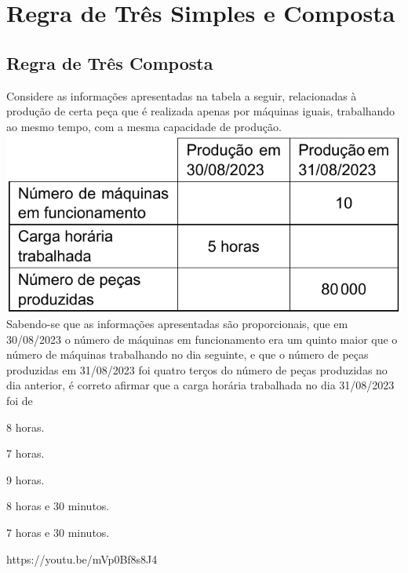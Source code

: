 \chapter{Regra de Três Simples e Composta}

\section{Regra de Três Composta}

{Considere as informações apresentadas na tabela a seguir, relacionadas à produção de certa peça que é
realizada apenas por máquinas iguais, trabalhando ao mesmo tempo, com a mesma capacidade de produção.\\
\includegraphics[scale=.5]{fig002.png}\\
Sabendo-se que as informações apresentadas são proporcionais, que em 30/08/2023 o número de máquinas
em funcionamento era um quinto maior que o número de máquinas trabalhando no dia seguinte, e que o número
de peças produzidas em 31/08/2023 foi quatro terços do número de peças produzidas no dia anterior, é correto afirmar que a carga horária trabalhada no dia 31/08/2023 foi de}
{\item 8 horas.
\item 7 horas.
\item 9 horas.
\item 8 horas e 30 minutos.
\item 7 horas e 30 minutos.}
{https://youtu.be/mVp0Bf8s8J4}

